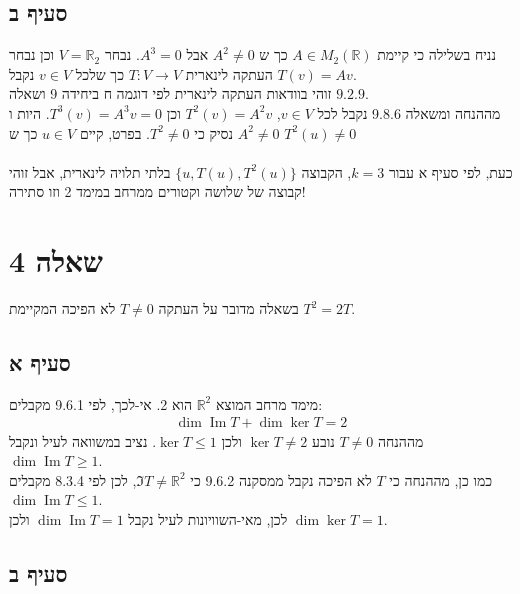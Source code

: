 \documentclass{article}
\DeclareMathOperator\Image{Im}
\def\reals{\mathbb{R}}
\begin{document}
\subsection*{סעיף ב}

נניח בשלילה כי קיימת $A\in M_2(\reals)$ כך ש $A^2\ne 0$ אבל $A^3=0$.
נבחר $V=\reals_2$ וכן נבחר העתקה לינארית $T: V\rightarrow V$ כך שלכל $v\in V$ נקבל $T(v)=Av$.\\
זוהי בוודאות העתקה לינארית לפי דוגמה ח ביחידה 9 ושאלה $9.2.9$. \\
מההנחה ומשאלה 9.8.6 נקבל לכל $v\in V$, $T^2(v)=A^2v$ וכן $T^3(v)=A^3v=0$.
היות ו$A^2\ne 0$ נסיק כי $T^2\ne 0$. בפרט, קיים $u\in V$ כך ש $T^2(u)\ne 0$
\\\\
כעת, לפי סעיף א עבור $k=3$, הקבוצה $\{ u, T(u), T^2(u) \}$ בלתי תלויה לינארית, אבל זוהי קבוצה של שלושה וקטורים ממרחב במימד 2 וזו סתירה!

\pagebreak

\section*{שאלה 4}

בשאלה מדובר על העתקה $T\ne 0$ לא הפיכה המקיימת $T^2=2T$.

\subsection*{סעיף א}

מימד מרחב המוצא $\reals^2$ הוא 2. אי-לכך, לפי 9.6.1 מקבלים:
\begin{align*}
    \dim \Image T + \dim \ker T = 2
\end{align*}
מההנחה $T\ne 0$ נובע $\ker T \ne 2$ ולכן $\ker T \leq 1$. נציב במשוואה לעיל ונקבל $\dim \Image T\geq 1$.\\
כמו כן, מההנחה כי $T$ לא הפיכה נקבל ממסקנה 9.6.2 כי $\Im T\ne \reals^2$, לכן לפי 8.3.4 מקבלים $\dim \Image T\leq 1$. \\
לכן, מאי-השוויונות לעיל נקבל $\dim \Image T=1$ ולכן $\dim \ker T=1$.

\subsection*{סעיף ב}
\end{document}
